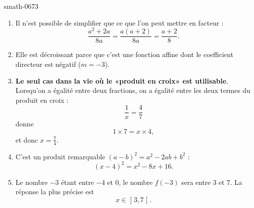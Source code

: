 
\begin{corrige}{smath-0673}

    \begin{enumerate}
        \item
            Il n'est possible de simplifier que ce que l'on peut mettre en facteur :
            \begin{equation}
                \frac{ a^2+2a }{ 8a }=\frac{ a(a+2) }{ 8a }=\frac{ a+2 }{ 8 }.
            \end{equation}
        \item
            Elle est décroissant parce que c'est une fonction affine dont le coefficient directeur est négatif (\( m=-3\)).
        \item
            {\bf Le seul cas dans la vie où le «produit en croix» est utilisable}. Lorsqu'on a égalité entre deux fractions, on a égalité entre les deux termes du produit en croix : 
            \begin{equation}
                \frac{1}{ x }=\frac{ 4 }{ 7 }
            \end{equation}
            donne
            \begin{equation}
                1\times 7=x\times 4,
            \end{equation}
            et donc \( x=\frac{ 7 }{ 4 }\).
        \item
            C'est un produit remarquable \( (a-b)^2=a^2-2ab+b^2\) :
            \begin{equation}
                (x-4)^2=x^2-8x+16.
            \end{equation}
        \item
            Le nombre \( -3\) étant entre \( -4\) et \( 0\), le nombre \( f(-3)\) sera entre \( 3\) et \( 7\). La réponse la plus précise est
            \begin{equation}
                x\in\mathopen] 3 , 7 \mathclose[.
            \end{equation}
    \end{enumerate}

\end{corrige}
